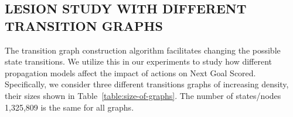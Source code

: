 \documentclass[]{article}
\begin{document}

\begin{table}[htb]
\caption{2013-2014 Top-8 Player Impacts For Penalties}
\label{table:top-player-impact-penalties}
\begin{center}
\end{center}
\end{table}

\subsection{LESION STUDY WITH DIFFERENT TRANSITION GRAPHS}
\label{subsec:lesion-study}


The transition graph construction algorithm facilitates changing the possible state transitions. We utilize this in our experiments to study how different propagation models affect the impact of actions on Next Goal Scored. Specifically, we consider three different transitions graphs of increasing density, their sizes shown in Table~\ref{table:size-of-graphs}. The number of states/nodes 1,325,809 is the same for all graphs.
\end{document}
